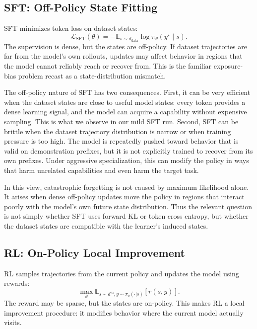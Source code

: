 \documentclass{article}
\begin{document}
\subsection{SFT: Off-Policy State Fitting}

SFT minimizes token loss on dataset states:
\begin{equation}
    \mathcal{L}_{\mathrm{SFT}}(\theta)
    =
    -\mathbb{E}_{s \sim d_{\mathrm{data}}}
    \log \pi_\theta(y^\star \mid s).
\end{equation}
The supervision is dense, but the states are off-policy. If dataset trajectories
are far from the model's own rollouts, updates may affect behavior in regions
that the model cannot reliably reach or recover from. This is the familiar
exposure-bias problem recast as a state-distribution mismatch.

The off-policy nature of SFT has two consequences. First, it can be very
efficient when the dataset states are close to useful model states: every token
provides a dense learning signal, and the model can acquire a capability without
expensive sampling. This is what we observe in our mild SFT run. Second, SFT can
be brittle when the dataset trajectory distribution is narrow or when training
pressure is too high. The model is repeatedly pushed toward behavior that is
valid on demonstration prefixes, but it is not explicitly trained to recover
from its own prefixes. Under aggressive specialization, this can modify the
policy in ways that harm unrelated capabilities and even harm the target task.

In this view, catastrophic forgetting is not caused by maximum likelihood alone.
It arises when dense off-policy updates move the policy in regions that interact
poorly with the model's own future state distribution. Thus the relevant
question is not simply whether SFT uses forward KL or token cross entropy, but
whether the dataset states are compatible with the learner's induced states.

\subsection{RL: On-Policy Local Improvement}

RL samples trajectories from the current policy and updates the model using
rewards:
\begin{equation}
    \max_\theta \mathbb{E}_{s \sim d^{\pi_\theta}, y \sim \pi_\theta(\cdot|s)}
    [r(s,y)].
\end{equation}
The reward may be sparse, but the states are on-policy. This makes RL a local
improvement procedure: it modifies behavior where the current model actually
visits.
\end{document}
